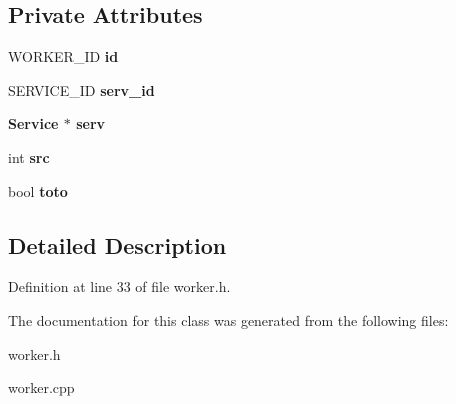 \subsection*{Private Attributes}
\begin{CompactItemize}
\item 
WORKER\_\-ID \bf{id}\label{class_worker_b5ffcb995e12fa71b9551e91729d6972}

\item 
SERVICE\_\-ID \bf{serv\_\-id}\label{class_worker_d7dc76e301fd2bcf5d3a2088a59f1378}

\item 
\bf{Service} $\ast$ \bf{serv}\label{class_worker_454e1764ed165af733cc44a73e395692}

\item 
int \bf{src}\label{class_worker_895c3ebc198018ea3391c09bc802d2f6}

\item 
bool \bf{toto}\label{class_worker_7ba5a18b2918cf9e704536b763be37f7}

\end{CompactItemize}


\subsection{Detailed Description}




Definition at line 33 of file worker.h.

The documentation for this class was generated from the following files:\begin{CompactItemize}
\item 
worker.h\item 
worker.cpp\end{CompactItemize}
